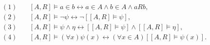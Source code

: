 \begin{align*}
(1)&\quad [A, R] \models a \in b \leftrightarrow a \in A \wedge b \in A \wedge a R b,\\
(2)&\quad [A, R] \models \neg \psi \leftrightarrow \neg [[A, R] \models \psi],\\
(3)&\quad [A, R] \models \psi \wedge \eta \leftrightarrow [[A, R] \models \psi] \wedge [[A, R] \models \eta],\\
(4)&\quad [A, R] \models (\forall x) \psi(x) \leftrightarrow (\forall x \in A) [[A, R] \models \psi(x)].
\end{align*}
